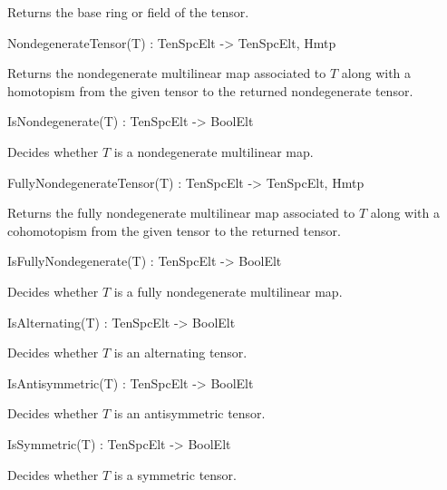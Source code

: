 Returns the base ring or field of the tensor.

\begin{intrinsics}
NondegenerateTensor(T) : TenSpcElt -> TenSpcElt, Hmtp
\end{intrinsics}

Returns the nondegenerate multilinear map associated to $T$ along with a homotopism 
from the given tensor to the returned nondegenerate tensor.

\begin{intrinsics}
IsNondegenerate(T) : TenSpcElt -> BoolElt
\end{intrinsics}

Decides whether $T$ is a nondegenerate multilinear map.

\begin{intrinsics}
FullyNondegenerateTensor(T) : TenSpcElt -> TenSpcElt, Hmtp
\end{intrinsics}

Returns the fully nondegenerate multilinear map associated to $T$ along with a
cohomotopism from the given tensor to the returned tensor.

\begin{intrinsics}
IsFullyNondegenerate(T) : TenSpcElt -> BoolElt
\end{intrinsics}

Decides whether $T$ is a fully nondegenerate multilinear map.

\begin{intrinsics}
IsAlternating(T) : TenSpcElt -> BoolElt
\end{intrinsics}

Decides whether $T$ is an alternating tensor.

\begin{intrinsics}
IsAntisymmetric(T) : TenSpcElt -> BoolElt
\end{intrinsics}

Decides whether $T$ is an antisymmetric tensor.

\begin{intrinsics}
IsSymmetric(T) : TenSpcElt -> BoolElt
\end{intrinsics}

Decides whether $T$ is a symmetric tensor.

